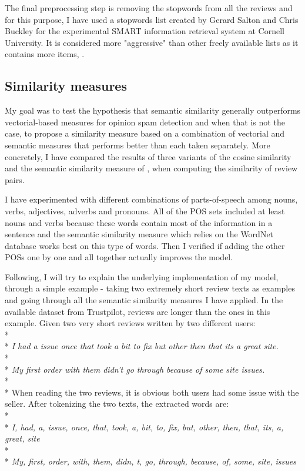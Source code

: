 The final preprocessing step is removing the stopwords from all the reviews and for this purpose, I have used a stopwords list created by Gerard Salton and Chris Buckley for the experimental SMART information retrieval system at Cornell University. It is considered more "aggressive" than other freely available lists as it contains more items, \citet{SaltonandBuckleyStopWordsAggresive}.

\subsection{Similarity measures}
My goal was to test the hypothesis that semantic similarity generally outperforms vectorial-based measures for opinion spam detection and when that is not the case, to propose a similarity measure based on a combination of vectorial and semantic measures that performs better than each taken separately. More concretely, I have compared the results of three variants of the cosine similarity and the semantic similarity measure of \citet{Mihalcea2006}, when computing the similarity of review pairs. 

I have experimented with different combinations of parts-of-speech among nouns, verbs, adjectives, adverbs and pronouns. All of the POS sets included at least nouns and verbs because these words contain most of the information in a sentence and the semantic similarity measure which relies on the WordNet database works best on this type of words. Then I verified if adding the other POSs one by one and all together actually improves the model.

Following, I will try to explain the underlying implementation of my model, through a simple example - taking two extremely short review texts as examples and going through all the semantic similarity measures I have applied. In the available dataset from Trustpilot, reviews are longer than the ones in this example.
Given two very short reviews written by two different users:
\\*
\\*
\textit{I had a issue once that took a bit to fix but other then that its a great site.}
\\*
\\*
\textit{My first order with them didn't go through because of some site issues.}
\\*
\\*
When reading the two reviews, it is obvious both users had some issue with the seller. After tokenizing the two texts, the extracted words are:
\\*
\\*
\textit{I, had, a, issue, once, that, took, a, bit, to, fix, but, other, then, that, its, a, great, site}
\\*
\\*
\textit{My, first, order, with, them, didn, t, go, through, because, of, some, site, issues}

